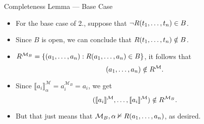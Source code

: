 \begin{frame}{Completeness Lemma --- Base Case}

  \begin{itemize}

  \item  For the base case of 2., suppose that
                            $\neg R(t_1, \mathellipsis, t_n)\in
                            B$.

                            \item Since $B$ is open, we can conclude
                            that $R(t_1,\mathellipsis, t_n)\notin
                            B$.

                            \item $R^{\mathcal{M}_B}=\{(a_1,
                              \mathellipsis, a_n): R(a_1,
                              \mathellipsis, a_n)\in B\}$, it follows
                              that \[(a_1, \mathellipsis, a_n)\notin
                              R^\mathcal{M}.\]

                              \item Since $\llbracket
                                a_i\rrbracket^\mathcal{M}_\alpha=a_i^{\mathcal{M}_B}=a_i$,
                                we get \[(\llbracket
                                a_i\rrbracket^\mathcal{M},
                                \mathellipsis, \llbracket
                                a_i\rrbracket^\mathcal{M})\notin
                                R^{\mathcal{M}_B}.\]

                                \item But that just means that
                                  $\mathcal{M}_B,\alpha\nvDash R(a_1,
                                  \mathellipsis, a_n)$, as desired.
   
  \end{itemize}


  
\end{frame}

